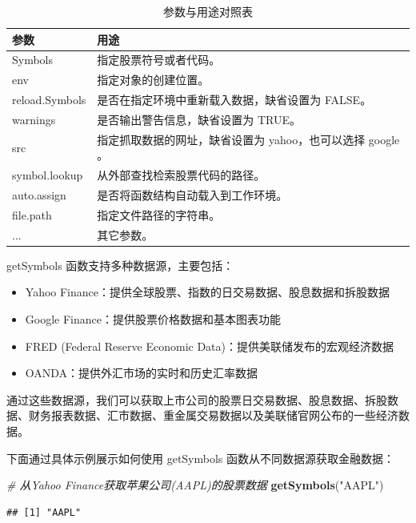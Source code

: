 \documentclass[]{ctexbook}
\newenvironment{Shaded}{\begin{snugshade}}{\end{snugshade}}
\newcommand{\CommentTok}[1]{\textcolor[rgb]{0.56,0.35,0.01}{\textit{#1}}}
\newcommand{\FunctionTok}[1]{\textcolor[rgb]{0.13,0.29,0.53}{\textbf{#1}}}
\newcommand{\NormalTok}[1]{#1}
\newcommand{\StringTok}[1]{\textcolor[rgb]{0.31,0.60,0.02}{#1}}
\providecommand{\tightlist}{%
  \setlength{\itemsep}{0pt}\setlength{\parskip}{0pt}}
\begin{document}
\begin{table}

\caption{\label{tab:param}参数与用途对照表}
\centering
\begin{tabular}[t]{ll}
\toprule
参数 & 用途\\
\midrule
Symbols & 指定股票符号或者代码。\\
env & 指定对象的创建位置。\\
reload.Symbols & 是否在指定环境中重新载入数据，缺省设置为 FALSE。\\
warnings & 是否输出警告信息，缺省设置为 TRUE。\\
src & 指定抓取数据的网址，缺省设置为 yahoo，也可以选择 google 。\\
\addlinespace
symbol.lookup & 从外部查找检索股票代码的路径。\\
auto.assign & 是否将函数结构自动载入到工作环境。\\
file.path & 指定文件路径的字符串。\\
... & 其它参数。\\
\bottomrule
\end{tabular}
\end{table}

getSymbols 函数支持多种数据源，主要包括：

\begin{itemize}
\tightlist
\item
  Yahoo Finance：提供全球股票、指数的日交易数据、股息数据和拆股数据
\item
  Google Finance：提供股票价格数据和基本图表功能
\item
  FRED (Federal Reserve Economic Data)：提供美联储发布的宏观经济数据
\item
  OANDA：提供外汇市场的实时和历史汇率数据
\end{itemize}

通过这些数据源，我们可以获取上市公司的股票日交易数据、股息数据、拆股数据、财务报表数据、汇市数据、重金属交易数据以及美联储官网公布的一些经济数据。

下面通过具体示例展示如何使用 getSymbols 函数从不同数据源获取金融数据：

\begin{Shaded}
\begin{Highlighting}[]
\CommentTok{\# 从Yahoo Finance获取苹果公司(AAPL)的股票数据}
\FunctionTok{getSymbols}\NormalTok{(}\StringTok{"AAPL"}\NormalTok{)}
\end{Highlighting}
\end{Shaded}

\begin{verbatim}
## [1] "AAPL"
\end{verbatim}
\end{document}
